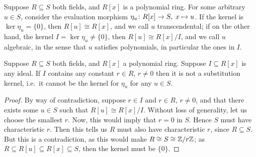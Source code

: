 \begin{definition}
    Suppose \(R \subseteq S\) both fields,
    and \(R[x]\) is a polynomial ring.
    For some arbitrary \(u \in S\),
    consider the evaluation morphism \(\eta_u\colon R[x]\to S,\;x\mapsto u\).
    If the kernel is \(\ker\eta_u = \{0\}\),
    then \(R[u] \cong R[x]\), and we call \(u\) transcendental;
    if on the other hand, the kernel \(I = \ker\eta_u \neq \{0\}\),
    then \(R[u] \cong R[x]/I\), and we call \(u\) algebraic,
    in the sense that \(u\) satisfies polynomials,
    in particular the ones in \(I\).
\end{definition}

\begin{theorem}
    Suppose \(R \subseteq S\) both fields,
    and \(R[x]\) a polynomial ring.
    Suppose \(I \subseteq R[x]\) is any ideal.
    If \(I\) contains any constant \(r \in R\), \(r \neq 0\)
    then it is not a substitution kernel,
    i.e.\ it cannot be the kernel for \(\eta_u\) for any \(u \in S\).
\end{theorem}
\begin{proof}
    By way of contradiction, suppose \(r \in I\) and \(r \in R\), \(r \neq 0\),
    and that there exists some \(u \in S\)
    such that \(R[u] \cong R[x]/I\).
    Without loss of generality, let us choose the smallest \(r\).
    Now, this would imply that \(r = 0\) in \(S\).
    Hence \(S\) must have characteristic \(r\).
    Then this tells us \(R\) must also have characteristic \(r\),
    since \(R \subseteq S\).
    But this is a contradiction,
    as this would make \(R \cong S \cong \mathbb{Z}/r\mathbb{Z}\);
    as \(R \subseteq R[u] \subseteq R[x] \subseteq S\),
    then the kernel must be \(\{0\}\).
\end{proof}

